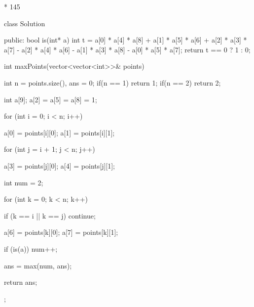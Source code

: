 * 145

		class Solution {
		public:
			bool is(int* a) {
				int t = a[0] * a[4] * a[8] + a[1] * a[5] * a[6] + a[2] * a[3] * a[7]
						- a[2] * a[4] * a[6] - a[1] * a[3] * a[8] - a[0] * a[5] * a[7];
				return t == 0 ? 1 : 0;
			}

			int maxPoints(vector<vector<int>>& points) {
				int n = points.size(), ans = 0;
				if(n == 1)
					return 1;
				if(n == 2)
					return 2;

				int a[9];
				a[2] = a[5] = a[8] = 1;

				for (int i = 0; i < n; i++) {
					a[0] = points[i][0];
					a[1] = points[i][1];

					for (int j = i + 1; j < n; j++) {
						a[3] = points[j][0];
						a[4] = points[j][1];

						int num = 2;

						for (int k = 0; k < n; k++) {

							if (k == i || k == j)
								continue;

							a[6] = points[k][0];
							a[7] = points[k][1];

							if (is(a))
								num++;
						}

						ans = max(num, ans);
					}
				}

				return ans;
			}
		};

